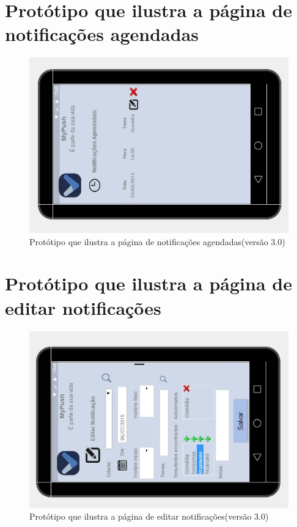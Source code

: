 \begin{apendicesenv}
    \pagebreak
      \section*{Protótipo que ilustra a página de notificações agendadas}

    \begin{figure}[!htbp]
      \centering
      \includegraphics[scale=0.9, angle=-90]{editaveis/figuras/prototipo_alta_fidelidade_v3/3_7}
      \caption{Protótipo que ilustra a página de notificações agendadas(versão 3.0)}
      \label{v3}
    \end{figure}
    
    \pagebreak
      \section*{Protótipo que ilustra a página de editar notificações}

    \begin{figure}[!htbp]
      \centering
      \includegraphics[scale=0.9, angle=-90]{editaveis/figuras/prototipo_alta_fidelidade_v3/3_8}
      \caption{Protótipo que ilustra a página de editar notificações(versão 3.0)}
      \label{v3}
    \end{figure}
    

\end{apendicesenv}
